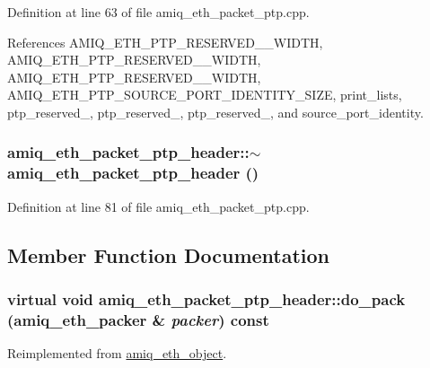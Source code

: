 Definition at line 63 of file amiq\_\-eth\_\-packet\_\-ptp.cpp.

References AMIQ\_\-ETH\_\-PTP\_\-RESERVED\_\_\-WIDTH, AMIQ\_\-ETH\_\-PTP\_\-RESERVED\_\_\-WIDTH, AMIQ\_\-ETH\_\-PTP\_\-RESERVED\_\_\-WIDTH, AMIQ\_\-ETH\_\-PTP\_\-SOURCE\_\-PORT\_\-IDENTITY\_\-SIZE, print\_\-lists, ptp\_\-reserved\_, ptp\_\-reserved\_, ptp\_\-reserved\_, and source\_\-port\_\-identity.\hypertarget{classamiq__eth__packet__ptp__header_aaad24bd23da748697622c571a00628fa}{
\subsubsection[{$\sim$amiq\_\-eth\_\-packet\_\-ptp\_\-header}]{\setlength{\rightskip}{0pt plus 5cm}amiq\_\-eth\_\-packet\_\-ptp\_\-header::$\sim$amiq\_\-eth\_\-packet\_\-ptp\_\-header ()}}
\label{classamiq__eth__packet__ptp__header_aaad24bd23da748697622c571a00628fa}


Definition at line 81 of file amiq\_\-eth\_\-packet\_\-ptp.cpp.

\subsection{Member Function Documentation}
\hypertarget{classamiq__eth__packet__ptp__header_ad850767754579cc65075215571e59d85}{
\subsubsection[{do\_\-pack}]{\setlength{\rightskip}{0pt plus 5cm}virtual void amiq\_\-eth\_\-packet\_\-ptp\_\-header::do\_\-pack ({\bf amiq\_\-eth\_\-packer} \& {\em packer}) const}}
\label{classamiq__eth__packet__ptp__header_ad850767754579cc65075215571e59d85}


Reimplemented from \hyperlink{classamiq__eth__object_a1c8e3c7f04c5a75ccfdb5140f1559879}{amiq\_\-eth\_\-object}.

